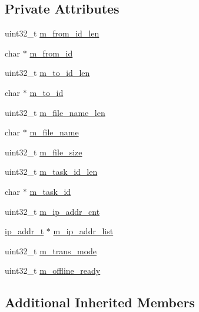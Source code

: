 \subsection*{Private Attributes}
\begin{DoxyCompactItemize}
\item 
uint32\+\_\+t \hyperlink{class_c_im_pdu_client_file_notify_a24b421886ea9a19fd042b2831261741b}{m\+\_\+from\+\_\+id\+\_\+len}
\item 
char $\ast$ \hyperlink{class_c_im_pdu_client_file_notify_a275e227782a372aaac7dcb9362561838}{m\+\_\+from\+\_\+id}
\item 
uint32\+\_\+t \hyperlink{class_c_im_pdu_client_file_notify_a0a955b21ce86d93ac0472d436f0af7cd}{m\+\_\+to\+\_\+id\+\_\+len}
\item 
char $\ast$ \hyperlink{class_c_im_pdu_client_file_notify_a320adc1d5207fcfd7d4e4c8b434ed1e2}{m\+\_\+to\+\_\+id}
\item 
uint32\+\_\+t \hyperlink{class_c_im_pdu_client_file_notify_a732a4d45df12349eb1ee6de6e2edf919}{m\+\_\+file\+\_\+name\+\_\+len}
\item 
char $\ast$ \hyperlink{class_c_im_pdu_client_file_notify_a2ada4ecddfb40de0317fd7056ef7ef8a}{m\+\_\+file\+\_\+name}
\item 
uint32\+\_\+t \hyperlink{class_c_im_pdu_client_file_notify_a6e11628e4093bd03a0f4d477489fe873}{m\+\_\+file\+\_\+size}
\item 
uint32\+\_\+t \hyperlink{class_c_im_pdu_client_file_notify_afe7e91bed70f67d0d4048d01c453224c}{m\+\_\+task\+\_\+id\+\_\+len}
\item 
char $\ast$ \hyperlink{class_c_im_pdu_client_file_notify_ac5b4246eaeb8156bfafaa54b7fb142e1}{m\+\_\+task\+\_\+id}
\item 
uint32\+\_\+t \hyperlink{class_c_im_pdu_client_file_notify_adbcc04635c1dbb0024c5d4f57009aa0a}{m\+\_\+ip\+\_\+addr\+\_\+cnt}
\item 
\hyperlink{structip__addr__t}{ip\+\_\+addr\+\_\+t} $\ast$ \hyperlink{class_c_im_pdu_client_file_notify_a3d1ec11ea71c87af596b22106ad7d6ea}{m\+\_\+ip\+\_\+addr\+\_\+list}
\item 
uint32\+\_\+t \hyperlink{class_c_im_pdu_client_file_notify_a5db3bf3dd56e3f783b75367b42d8cc31}{m\+\_\+trans\+\_\+mode}
\item 
uint32\+\_\+t \hyperlink{class_c_im_pdu_client_file_notify_adf65543c33598b056207a06d11fe45c8}{m\+\_\+offline\+\_\+ready}
\end{DoxyCompactItemize}
\subsection*{Additional Inherited Members}


